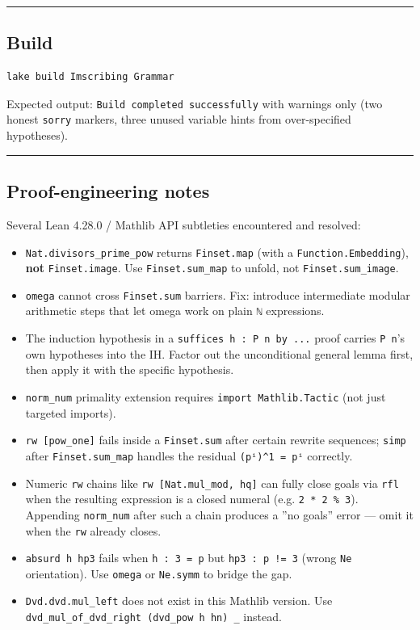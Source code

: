 \documentclass[12pt,a4paper]{article}
\begin{document}
\begin{center}
\rule{0.5\textwidth}{0.4pt}
\end{center}

\subsection{Build}

\begin{lstlisting}[language=bash]
lake build Imscribing Grammar
\end{lstlisting}

Expected output: \texttt{Build completed successfully} with warnings only (two honest \texttt{sorry} markers,
three unused variable hints from over-specified hypotheses).

\begin{center}
\rule{0.5\textwidth}{0.4pt}
\end{center}

\subsection{Proof-engineering notes}

Several Lean 4.28.0 / Mathlib API subtleties encountered and resolved:

\begin{itemize}
    \item \texttt{Nat.divisors\_prime\_pow} returns \texttt{Finset.map} (with a \texttt{Function.Embedding}), \textbf{not}
\texttt{Finset.image}. Use \texttt{Finset.sum\_map} to unfold, not \texttt{Finset.sum\_image}.
    \item \texttt{omega} cannot cross \texttt{Finset.sum} barriers. Fix: introduce intermediate modular arithmetic
steps that let omega work on plain \texttt{ℕ} expressions.
    \item The induction hypothesis in a \texttt{suffices h : P n by ...} proof carries \texttt{P n}'s
own hypotheses into the IH. Factor out the unconditional general lemma first, then
apply it with the specific hypothesis.
    \item \texttt{norm\_num} primality extension requires \texttt{import Mathlib.Tactic} (not just targeted imports).
    \item \texttt{rw {[}pow\_one{]}} fails inside a \texttt{Finset.sum} after certain rewrite sequences; \texttt{simp} after
\texttt{Finset.sum\_map} handles the residual \texttt{(pⁱ)\^{}1 = pⁱ} correctly.
    \item Numeric \texttt{rw} chains like \texttt{rw {[}Nat.mul\_mod, hq{]}} can fully close goals via \texttt{rfl} when
the resulting expression is a closed numeral (e.g. \texttt{2 * 2 \% 3}). Appending \texttt{norm\_num}
after such a chain produces a ''no goals'' error --- omit it when the \texttt{rw} already closes.
    \item \texttt{absurd h hp3} fails when \texttt{h : 3 = p} but \texttt{hp3 : p != 3} (wrong \texttt{Ne} orientation).
Use \texttt{omega} or \texttt{Ne.symm} to bridge the gap.
    \item \texttt{Dvd.dvd.mul\_left} does not exist in this Mathlib version. Use
\texttt{dvd\_mul\_of\_dvd\_right (dvd\_pow h hn) \_} instead.
\end{itemize}
\end{document}
